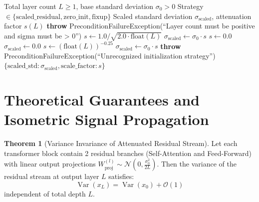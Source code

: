 \documentclass[11pt,a4paper]{article}
\theoremstyle{definition}
\newtheorem{theorem}{Theorem}[section]
\begin{document}
\begin{algorithm}[H]
\caption{Deep Residual Initialization Scale Factor Computation}
\begin{algorithmic}[1]
\Require Total layer count $L \ge 1$, base standard deviation $\sigma_0 > 0$
\Require Strategy $\in \{\text{scaled\_residual}, \text{zero\_init}, \text{fixup}\}$
\Ensure Scaled standard deviation $\sigma_{\text{scaled}}$, attenuation factor $s(L)$
    \State \textbf{throw} PreconditionFailureException(``Layer count must be positive and sigma must be > 0'')
\EndIf
{}
    \State $s \gets 1.0 / \sqrt{2.0 \cdot \text{float}(L)}$
    \State $\sigma_{\text{scaled}} \gets \sigma_0 \cdot s$
    \State $s \gets 0.0$
    \State $\sigma_{\text{scaled}} \gets 0.0$
    \State $s \gets (\text{float}(L))^{-0.25}$
    \State $\sigma_{\text{scaled}} \gets \sigma_0 \cdot s$
\Else
    \State \textbf{throw} PreconditionFailureException(``Unrecognized initialization strategy'')
\EndIf
\State \Return $\{\text{scaled\_std}: \sigma_{\text{scaled}}, \text{scale\_factor}: s\}$
\end{algorithmic}
\end{algorithm}

\section{Theoretical Guarantees and Isometric Signal Propagation}

\begin{theorem}[Variance Invariance of Attenuated Residual Stream]
Let each transformer block contain 2 residual branches (Self-Attention and Feed-Forward) with linear output projections $W_{\text{proj}}^{(l)} \sim \mathcal{N}\left(0, \frac{\sigma_0^2}{2L}\right)$. Then the variance of the residual stream at output layer $L$ satisfies:
\begin{equation}
\operatorname{Var}(x_L) = \operatorname{Var}(x_0) + \mathcal{O}(1)
\end{equation}
independent of total depth $L$.
\end{theorem}
\end{document}
